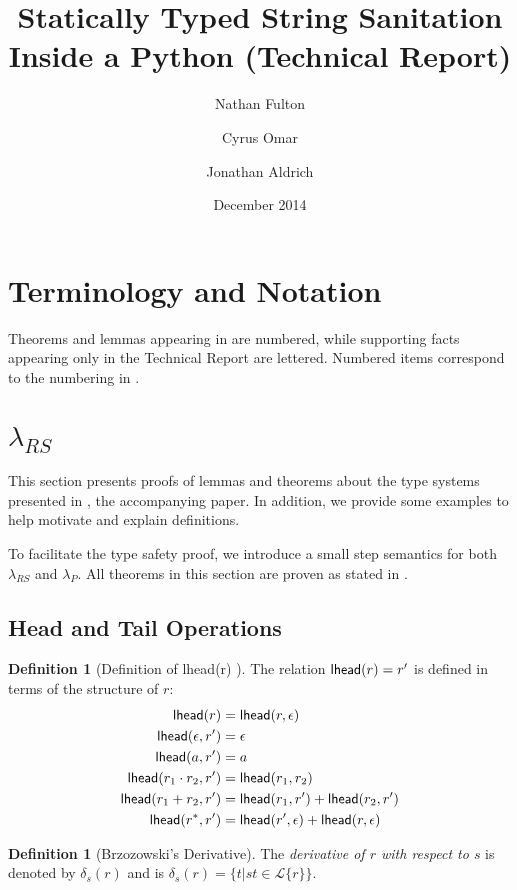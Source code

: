 \documentclass[11pt,leqno]{article}
\title{Statically Typed String Sanitation Inside a Python (Technical Report)}
\author{Nathan Fulton \and Cyrus Omar \and Jonathan Aldrich}
\date{December 2014}
\theoremstyle{definition}
\newtheorem{defn}[thm]{Definition}
\newcommand{\Lagr}{\mathcal{L}}
\newcommand{\lang}[1]{\Lagr\{#1\}}
\newcommand{\lambdas}{\lambda_{RS}}
\newcommand{\lambdap}{\lambda_P}
\newcommand{\lhead}[1]{ {\sf lhead}(#1) }
\begin{document}
\maketitle
\section{Terminology and Notation}
Theorems and lemmas appearing in \cite{fulton2014} are numbered, while supporting facts appearing only in the Technical Report are lettered.
Numbered items correspond to the numbering in \cite{fulton2014}.

\section{$\lambdas$}

This section presents proofs of lemmas and theorems about the type systems
presented in \cite{fulton2014}, the accompanying paper. In addition, we provide some examples to help 
motivate and explain definitions.

To facilitate the type safety proof, we introduce
a small step semantics for both $\lambdas$ and $\lambdap$. All theorems in
this section are proven as stated in \cite{fulton2014}.

\subsection{Head and Tail Operations}

\begin{defn}[Definition of \lhead{r}]\label{def:lhead}
The relation $\lhead{r}=r'$ is defined in terms of the structure of $r$:
\begin{align*}
\lhead{r}                 &= \lhead{r, \epsilon} \\
\lhead{\epsilon, r'}      &= \epsilon \\
\lhead{a, r'}             &= a \\
\lhead{r_1\cdot r_2, r'}  &= \lhead{r_1, r_2} \\
\lhead{r_1 + r_2, r'}     &= \lhead{r_1, r'} + \lhead{r_2, r'} \\
\lhead{r^*, r'}           &= \lhead{r', \epsilon} + \lhead{r, \epsilon}
\end{align*}
\end{defn}

\begin{defn}[Brzozowski's Derivative]\label{def:derivative}
  The \emph{derivative of $r$ with respect to $s$} is denoted by $\delta_s(r)$
  and is $\delta_s(r) = \{t | st \in \lang{r}\}$.
\end{defn}
\end{document}
